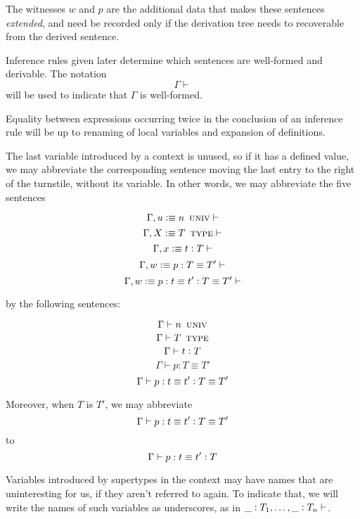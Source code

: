 \documentclass[11pt]{article}
\newcommand{\eqd}{\equiv}
\newcommand{\ccolon}{\vcentcolon}
\newcommand{\ccheck}{\vcentcolon}            %
\newcommand{\csynth}{\vcentcolon\vcentcolon} %
\renewcommand{\csynth}{\ccheck}              %
\newcommand{\Univ}{\mathop{\text{ \sc univ}}}
\newcommand{\Type}{\mathop{\text{ \sc type}}}
\newcommand{\Okay}{\mathop{\text{ \sc okay}}}
\newcommand{\Context}{\vdash\Okay}
\renewcommand{\Context}{\vdash}
\newcommand{\var}{\char`_}
\newcommand{\defn}{\vcentcolon\equiv}
\begin{document}
The witnesses $w$ and $p$ are the additional data that makes these sentences
{\em extended}, and need be recorded only if the derivation tree needs to
recoverable from the derived sentence.

Inference rules given later determine which sentences are well-formed and
derivable.  The notation $$\Gamma \Context$$ will be used to indicate that
$\Gamma$ is well-formed.

Equality between expressions occurring twice in the conclusion of an inference
rule will be up to renaming of local variables and expansion of definitions.

The last variable introduced by a context is unused, so if it has a defined
value, we may abbreviate the corresponding sentence moving the last entry to
the right of the turnstile, without its variable.  In other words, we may
abbreviate the five sentences

$$ \Gamma, u \defn n \Univ \Context $$
$$ \Gamma, X \defn T \Type \Context $$
$$ \Gamma, x \defn t \ccolon T \Context $$
$$ \Gamma, w \defn p : T \eqd T' \Context $$
$$ \Gamma, w \defn p : t \eqd t' \ccolon T \eqd T' \Context $$

by the following sentences:

$$ \Gamma \vdash n \Univ $$
$$ \Gamma \vdash T \Type $$
$$ \Gamma \vdash t \ccolon T $$
$$ \Gamma \vdash p : T \eqd T' $$
$$ \Gamma \vdash p : t \eqd t' \ccolon T \eqd T' $$

Moreover, when $T$ is $T'$, we may abbreviate
$$ \Gamma \vdash p : t \eqd t' \ccolon T \eqd T' $$
to
$$ \Gamma \vdash p : t \eqd t' \ccolon T $$

Variables introduced by supertypes in the context may have names that are
uninteresting for us, if they aren't referred to again.  To indicate that, we
will write the names of such variables as underscores, as in $\var
\ccolon T_1,\dots,\var \ccolon T_n\Context$.





\end{document}
